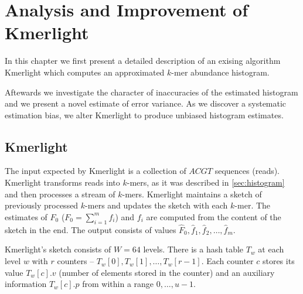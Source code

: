 \chapter{Analysis and Improvement of Kmerlight}
In this chapter we first present a detailed description of an exising algorithm Kmerlight \cite{Sivadasan2016}
which computes an approximated $k$-mer abundance histogram.

Aftewards we investigate the character of inaccuracies of the estimated histogram and we present a novel
estimate of error variance. As we discover a systematic estimation bias, we alter Kmerlight to produce
unbiased histogram estimates. 

\section{Kmerlight}
The input expected by Kmerlight is a collection of $ACGT$ sequences (reads).
Kmerlight transforms reads into $k$-mers, as it was described in \ref{sec:histogram}
and then processes a stream of $k$-mers. Kmerlight maintains a sketch of previously
processed $k$-mers and updates the sketch with each $k$-mer. The estimates of $F_0$ ($F_0 = \sum_{i=1}^{m} f_i$)
and $f_i$ are computed from the content of the sketch in the end. The output consists
of values $\hat F_0, \hat f_1, \hat f_2, \dots, \hat f_m$.

Kmerlight's sketch consists of $W=64$ levels. There is a hash table $T_w$ at each level $w$ with $r$ counters -- $T_w[0], T_w[1], \dots, T_w[r-1]$.
Each counter $c$ stores its value $T_w[c].v$ (number of elements stored in the counter) and an auxiliary information $T_w[c].p$ from within a range
$0, \dots, u-1$.


